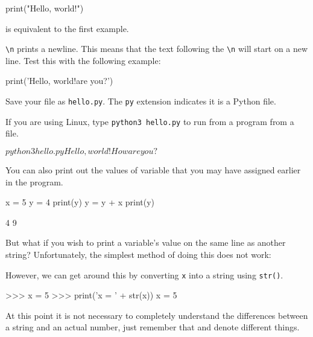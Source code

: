 \documentclass[11pt]{cselabheader}
\begin{document}
\begin{python3code}
print("Hello, world!")
\end{python3code}

is equivalent to the first example.

\texttt{\textbackslash n} prints a newline. This means that the text following
the \texttt{\textbackslash n} will start on a new line. Test this with the
following example:

\begin{python3code}
print('Hello, world!\nHow are you?')
\end{python3code}

Save your file as \texttt{hello.py}. The \texttt{py} extension indicates it is a
Python file.

If you are using Linux, type \texttt{python3 hello.py} to run from a program
from a file.

\begin{bashcode}
$ python3 hello.py
Hello, world!
How are you?
$
\end{bashcode}

You can also print out the values of variable that you may have assigned earlier
in the program.

\begin{python3code}
x = 5
y = 4
print(y)
y = y + x
print(y)
\end{python3code}

\begin{bashcode}
4
9
\end{bashcode}

But what if you wish to print a variable's value on the same line as another
string? Unfortunately, the simplest method of doing this does not work:


However, we can get around this by converting \texttt{x} into a string using
\texttt{str()}.

\begin{pyconcode}
>>> x = 5
>>> print('x = ' + str(x))
x = 5
\end{pyconcode}

At this point it is not necessary to completely understand the differences
between a string and an actual number, just remember that 
and  denote different things.
\end{document}
